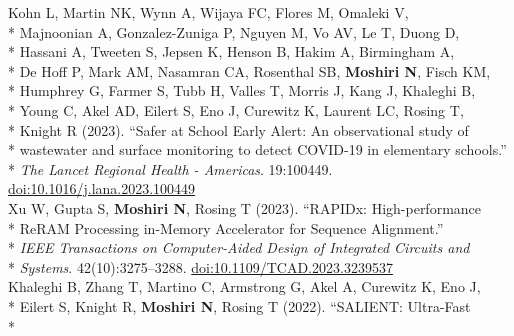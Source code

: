 \documentclass[margin,line]{res}
\begin{document}
\begin{resume}
\hspace*{9.5mm} Kohn L, Martin NK, Wynn A, Wijaya FC, Flores M, Omaleki V,\\*
\hspace*{9.5mm} Majnoonian A, Gonzalez-Zuniga P, Nguyen M, Vo AV, Le T, Duong D,\\*
\hspace*{9.5mm} Hassani A, Tweeten S, Jepsen K, Henson B, Hakim A, Birmingham A,\\*
\hspace*{9.5mm} De Hoff P, Mark AM, Nasamran CA, Rosenthal SB, \textbf{Moshiri N}, Fisch KM,\\*
\hspace*{9.5mm} Humphrey G, Farmer S, Tubb H, Valles T, Morris J, Kang J, Khaleghi B,\\*
\hspace*{9.5mm} Young C, Akel AD, Eilert S, Eno J, Curewitz K, Laurent LC, Rosing T,\\*
\hspace*{9.5mm} Knight R (2023). ``Safer at School Early Alert: An observational study of\\*
\hspace*{9.5mm} wastewater and surface monitoring to detect COVID-19 in elementary schools.''\\*\vspace{2mm}
\hspace*{8mm} \textit{The Lancet Regional Health - Americas}. 19:100449. \href{https://doi.org/10.1016/j.lana.2023.100449}{doi:10.1016/j.lana.2023.100449}\\
\hspace*{4mm} Xu W, Gupta S, \textbf{Moshiri N}, Rosing T (2023). ``RAPIDx: High-performance\\*
\hspace*{9.5mm} ReRAM Processing in-Memory Accelerator for Sequence Alignment.''\\*
\hspace*{9.5mm} \textit{IEEE Transactions on Computer-Aided Design of Integrated Circuits and}\\*\vspace{2mm}
\hspace*{8mm} \textit{Systems}. 42(10):3275--3288. \href{https://doi.org/10.1109/TCAD.2023.3239537}{doi:10.1109/TCAD.2023.3239537}\\
\hspace*{4mm} Khaleghi B, Zhang T, Martino C, Armstrong G, Akel A, Curewitz K, Eno J,\\*
\hspace*{9.5mm} Eilert S, Knight R, \textbf{Moshiri N}, Rosing T (2022). ``SALIENT: Ultra-Fast\\*

\end{resume}
\end{document}
